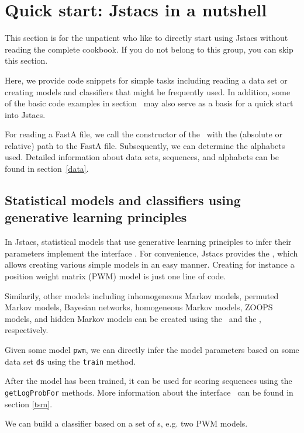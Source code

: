 \section{Quick start: Jstacs in a nutshell}\label{start}
\renewcommand{\codefile}{recipes/TrainPWM.java}
This section is for the unpatient who like to directly start using Jstacs without reading the complete cookbook. If you do not belong to this group, you can skip this section.

Here, we provide code snippets for simple tasks including reading a data set or creating models and classifiers that might be frequently used. In addition, some of the basic code examples in section~ may also serve as a basis for a quick start into Jstacs.

For reading a FastA file, we call the constructor of the \DNADataSet~with the (absolute or relative) path to the FastA file. Subsequently, we can determine the alphabets used.
\setcounter{off}{37}
Detailed information about data sets, sequences, and alphabets can be found in section~\ref{data}.

\subsection{Statistical models and classifiers using generative learning principles}

In Jstacs, statistical models that use generative learning principles to infer their parameters implement the interface \TrainSM. For convenience, Jstacs provides the \TrainSMFactory, which allows creating various simple models in an easy manner. Creating for instance a position weight matrix (PWM) model is just one line of code.
\addtocounter{off}{3}
Similarily, other models including inhomogeneous Markov models, permuted Markov models, Bayesian networks, homogeneous Markov models, ZOOPS models, and hidden Markov models can be created using the \TrainSMFactory~and the \HMMFactory, respectively.

Given some model \lstinline+pwm+, we can directly infer the model parameters based on some data set \lstinline+ds+ using the \lstinline+train+ method.
\addtocounter{off}{2}
After the model has been trained, it can be used for scoring sequences using the \lstinline+getLogProbFor+ methods. More information about the interface \TrainSM~can be found in section \ref{tsm}.

We can build a classifier based on a set of \TrainSM s, e.g. two PWM models.
\renewcommand{\codefile}{\defaultcodefile}
\setcounter{off}{554}


